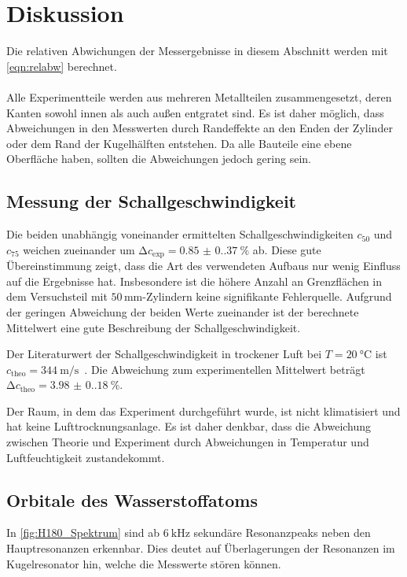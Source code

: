 \section{Diskussion}
\label{sec:Diskussion}
Die relativen Abwichungen der Messergebnisse in diesem Abschnitt werden mit \autoref{eqn:relabw} berechnet.
\\\\
Alle Experimentteile werden aus mehreren Metallteilen zusammengesetzt, deren Kanten sowohl innen als auch außen entgratet sind.
Es ist daher möglich, dass Abweichungen in den Messwerten durch Randeffekte an den Enden der Zylinder oder dem Rand der Kugelhälften entstehen.
Da alle Bauteile eine ebene Oberfläche haben, sollten die Abweichungen jedoch gering sein.
\subsection{Messung der Schallgeschwindigkeit}
Die beiden unabhängig voneinander ermittelten Schallgeschwindigkeiten $c_{50}$ und $c_{75}$ weichen zueinander um $\increment c_{\exp} = \qty{0.85(0.37)}{\percent}$ ab.
Diese gute Übereinstimmung zeigt, dass die Art des verwendeten Aufbaus nur wenig Einfluss auf die Ergebnisse hat.
Insbesondere ist die höhere Anzahl an Grenzflächen in dem Versuchsteil mit $50\,\unit{\milli\meter}$-Zylindern keine signifikante Fehlerquelle.
Aufgrund der geringen Abweichung der beiden Werte zueinander ist der berechnete Mittelwert eine gute Beschreibung der Schallgeschwindigkeit.

\noindent
Der Literaturwert der Schallgeschwindigkeit in trockener Luft bei $T = \qty{20}{\celsius}$ ist $c_{\mathrm{theo}} = \qty{344}{\meter\per\second} $~\cite[22]{friesecke_2014}.
Die Abweichung zum experimentellen Mittelwert beträgt $\increment c_{\mathrm{theo}} = \qty{3.98(0.18)}{\percent}$.

\noindent
Der Raum, in dem das Experiment durchgeführt wurde, ist nicht klimatisiert und hat keine Lufttrocknungsanlage. 
Es ist daher denkbar, dass die Abweichung zwischen Theorie und Experiment durch Abweichungen in Temperatur und Luftfeuchtigkeit zustandekommt.
%
%
%
\subsection{Orbitale des Wasserstoffatoms}
In \autoref{fig:H180_Spektrum} sind ab $\qty{6}{\kilo\hertz}$ sekundäre Resonanzpeaks neben den Hauptresonanzen erkennbar.
Dies deutet auf Überlagerungen der Resonanzen im Kugelresonator hin, welche die Messwerte stören können.

